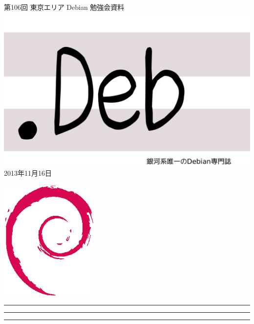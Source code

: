 \documentclass[mingoth,a4paper]{jsarticle}
\newcommand{\debmtgyear}{2013}
\newcommand{\debmtgmonth}{11}
\newcommand{\debmtgdate}{16}
\newcommand{\debmtgnumber}{106}
\begin{document}
\begin{titlepage}
\thispagestyle{empty}

\vspace*{-2cm}
第\debmtgnumber{}回 東京エリア Debian 勉強会資料\\
\hspace*{-2cm}
\includegraphics{image2012-natsu/dotdeb.pdf}\\
\hfill{}\debmtgyear{}年\debmtgmonth{}月\debmtgdate{}日



\vspace*{-2cm}
\hfill{}\includegraphics[height=6cm]{image200502/openlogo-nd.eps}
\end{titlepage}

\newpage

\begin{minipage}[b]{0.2\hsize}
 \colorbox{titleback}{}
\end{minipage}
\begin{minipage}[b]{0.8\hsize}
\hrule
\vspace{2mm}
\hrule
\begin{multicols}{2}
\tableofcontents
\end{multicols}
\vspace{2mm}
\hrule
\end{minipage}
\end{document}
